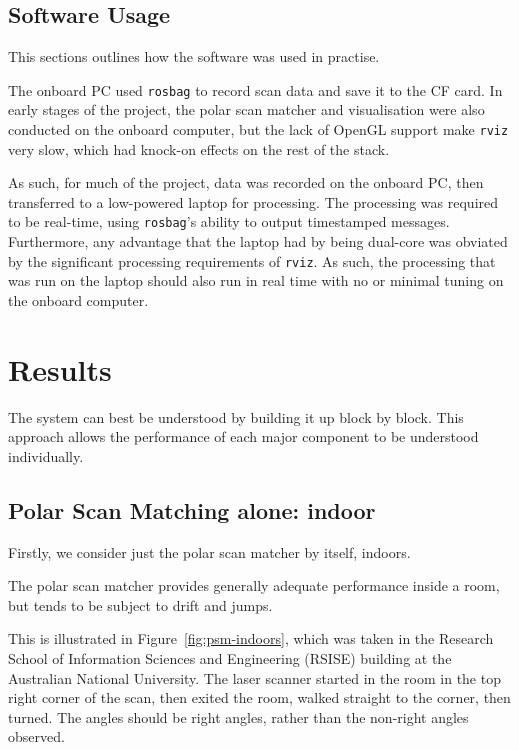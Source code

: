 \documentclass[12pt,oneside,a4paper]{book}
\begin{document}
\section{Software Usage}
\label{sec:software-usage}

This sections outlines how the software was used in practise.

The onboard PC used \texttt{rosbag} to record scan data and save it to
the CF card. In early stages of the project, the polar scan matcher
and visualisation were also conducted on the onboard computer, but the
lack of OpenGL support make \texttt{rviz} very slow, which had
knock-on effects on the rest of the stack.

As such, for much of the project, data was recorded on the onboard PC,
then transferred to a low-powered laptop for processing. The
processing was required to be real-time, using \texttt{rosbag}'s
ability to output timestamped messages. Furthermore, any advantage
that the laptop had by being dual-core was obviated by the significant
processing requirements of \texttt{rviz}. As such, the processing that
was run on the laptop should also run in real time with no or minimal
tuning on the onboard computer.

\chapter{Results}
\label{cha:results}

The system can best be understood by building it up block by
block. This approach allows the performance of each major component to
be understood individually.

\section{Polar Scan Matching alone: indoor}
\label{sec:psm-indoor}

Firstly, we consider just the polar scan matcher by itself, indoors.

The polar scan matcher provides generally adequate performance inside
a room, but tends to be subject to drift and jumps. 

This is illustrated in Figure~\ref{fig:psm-indoors}, which was taken
in the Research School of Information Sciences and Engineering (RSISE)
building at the Australian National University. The laser scanner
started in the room in the top right corner of the scan, then exited
the room, walked straight to the corner, then turned. The angles
should be right angles, rather than the non-right angles observed.
\end{document}

